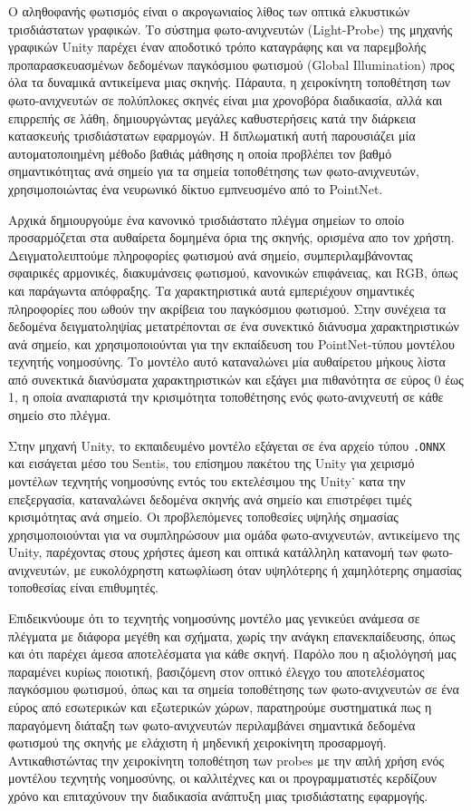 \gr Ο αληθοφανής φωτισμός είναι ο ακρογωνιαίος λίθος των οπτικά ελκυστικών τρισδιάστατων γραφικών. Το σύστημα φωτο-ανιχνευτών (\en Light-Probe) \gr της μηχανής γραφικών \en Unity \gr παρέχει έναν αποδοτικό τρόπο καταγράφης και να παρεμβολής προπαρασκευασμένων δεδομένων παγκόσμιου φωτισμού (\en Global Illumination) \gr προς όλα τα δυναμικά αντικείμενα μιας σκηνής. Πάραυτα, η χειροκίνητη τοποθέτηση των  φωτο-ανιχνευτών σε πολύπλοκες σκηνές είναι μια χρονοβόρα διαδικασία, αλλά και επιρρεπής σε λάθη, δημιουργώντας μεγάλες καθυστερήσεις κατά την διάρκεια κατασκευής τρισδιάστατων εφαρμογών. Η διπλωματική αυτή παρουσιάζει μία αυτοματοποιημένη μέθοδο βαθιάς μάθησης η οποία προβλέπει τον βαθμό σημαντικότητας ανά σημείο για τα σημεία τοποθέτησης των φωτο-ανιχνευτών, χρησιμοποιώντας ένα νευρωνικό δίκτυο εμπνευσμένο από το \en PointNet.

\gr Αρχικά δημιουργούμε ένα κανονικό τρισδιάστατο πλέγμα σημείων το οποίο προσαρμόζεται στα αυθαίρετα δομημένα όρια της σκηνής, ορισμένα απο τον χρήστη. Δειγματολειπτούμε  πληροφορίες φωτισμού ανά σημείο, συμπεριλαμβάνοντας σφαιρικές αρμονικές, διακυμάνσεις φωτισμού, κανονικών επιφάνειας, και \en RGB, \gr όπως και παράγωντα απόφραξης. Τα χαρακτηριστικά αυτά εμπεριέχουν σημαντικές πληροφορίες που ωθούν την ακρίβεια του παγκόσμιου φωτισμού. Στην συνέχεια τα δεδομένα δειγματοληψίας μετατρέπονται σε ένα συνεκτικό διάνυσμα χαρακτηριστικών ανά σημείο, και χρησιμοποιούνται για την εκπαίδευση του \en PointNet-\gr τύπου μοντέλου τεχνητής νοημοσύνης. Το μοντέλο αυτό καταναλώνει μία αυθαίρετου μήκους λίστα από συνεκτικά διανύσματα χαρακτηριστικών και εξάγει μια πιθανότητα σε εύρος 0 έως 1, η οποία αναπαριστά την κρισιμότητα τοποθέτησης ενός  φωτο-ανιχνευτή σε κάθε σημείο στο πλέγμα.

\gr Στην μηχανή \en Unity, \gr το εκπαιδευμένο μοντέλο εξάγεται σε ένα αρχείο τύπου \en \verb*|.ONNX| \gr και εισάγεται μέσο του \en Sentis, \gr του επίσημου πακέτου της \en Unity \gr για χειρισμό μοντέλων τεχνητής νοημοσύνης εντός του εκτελέσιμου της \en Unity˙ \gr κατα την επεξεργασία, καταναλώνει δεδομένα σκηνής ανά σημείο και επιστρέφει τιμές κρισιμότητας ανά σημείο. Οι προβλεπόμενες τοποθεσίες υψηλής σημασίας χρησιμοποιούνται για να συμπληρώσουν μια ομάδα φωτο-ανιχνευτών, αντικείμενο της \en Unity, \gr παρέχοντας στους χρήστες άμεση και οπτικά κατάλληλη κατανομή των φωτο-ανιχνευτών, με ευκολόχρηστη κατωφλίωση όταν υψηλότερης ή χαμηλότερης σημασίας τοποθεσίας είναι επιθυμητές.

\gr Επιδεικνύουμε ότι το τεχνητής νοημοσύνης μοντέλο μας γενικεύει ανάμεσα σε πλέγματα με διάφορα μεγέθη και σχήματα, χωρίς την ανάγκη επανεκπαίδευσης, όπως και ότι παρέχει άμεσα αποτελέσματα για κάθε σκηνή. Παρόλο που η αξιολόγησή μας παραμένει κυρίως ποιοτική, βασιζόμενη στον οπτικό έλεγχο του αποτελέσματος παγκόσμιου φωτισμού, όπως και τα σημεία τοποθέτησης των φωτο-ανιχνευτών σε ένα εύρος από εσωτερικών και εξωτερικών χώρων, παρατηρούμε συστηματικά πως η παραγόμενη διάταξη των φωτο-ανιχνευτών περιλαμβάνει σημαντικά δεδομένα φωτισμού της σκηνής με ελάχιστη ή μηδενική χειροκίνητη προσαρμογή. Αντικαθιστώντας την χειροκίνητη τοποθέτηση των probes με την απλή χρήση ενός μοντέλου τεχνητής νοημοσύνης, οι καλλιτέχνες και οι προγραμματιστές κερδίζουν χρόνο και επιταχύνουν την διαδικασία ανάπτυξη μιας τρισδιάστατης εφαρμογής.\en
